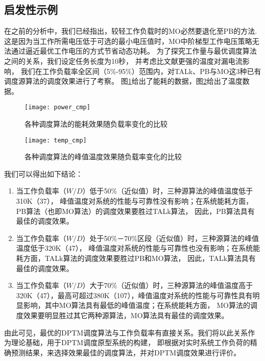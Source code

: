 \subsection{启发性示例}
在之前的分析中，我们已经指出，较轻工作负载时的MO必然要退化至PB的方法. 这是因为当工作所需电压低于可选的最小电压值时，MO中阶梯型工作电压策略无法通过逼近最优工作电压的方式节省动态功耗。 为了探究工作量与最优调度算法之间的关系，我们设定任务长度为10秒， 并考虑比文献更强的温度对漏电流影响， 我们在工作负载率全区间（5\%-95\%）范围内，对TALk、PB与MO这3种已有调度源算法的调度效果进行了考察。 图\ref{fig:exp-power-cmp}给出了能耗的数据，图\ref{fig:exp-temp-cmp}给出了温度数据。
\begin{figure}%
  \centering
  \texttt{[image: power\_cmp]}
  \caption{各种调度算法的能耗效果随负载率变化的比较}
  \label{fig:exp-power-cmp}
\end{figure}
\begin{figure}%
  \centering
  \texttt{[image: temp\_cmp]}
  \caption{各种调度算法的峰值温度效果随负载率变化的比较}
  \label{fig:exp-temp-cmp}
\end{figure}

我们可以得出如下结论：
\begin{enumerate}[1)]
\item 当工作负载率（$W/D$）低于50\%（近似值）时，三种源算法的峰值温度低于310K（37\celsius）， 峰值温度对系统的性能与可靠性没有影响；在系统能耗方面，PB算法（也即MO算法）的调度效果要胜过TALk算法， 因此，PB算法具有最佳的调度效果。
\item 当工作负载率（$W/D$）处于50\%－70\%区段（近似值）时，三种源算法的峰值温度低于320K（47\celsius）， 峰值温度对系统的性能与可靠性也没有影响；在系统能耗方面，TALk算法的调度效果要胜过PB和MO算法， 因此，TALk算法具有最佳的调度效果。
\item 当工作负载率（$W/D$）大于70\%（近似值）时，三种源算法的峰值温度高于320K（47\celsius ），最高可超过380K（107\celsius ），峰值温度对系统的性能与可靠性具有明显影响，其中MO算法具有最低的峰值温度；在系统能耗方面， MO算法的调度效果要明显胜过其它两种源算法，MO算法具有最佳的调度效果。
\end{enumerate}

由此可见，最优的DPTM调度算法与工作负载率有直接关系。我们将以此关系作为理论基础，用于DPTM调度原型系统的构建， 即根据对实时系统工作负荷的精确预测结果，来选择效果最佳的调度算法，并对DPTM调度效果进行评价。

